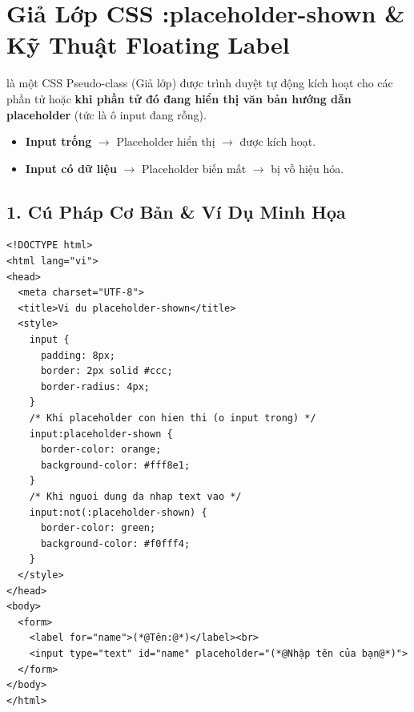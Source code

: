 \section{Giả Lớp CSS :placeholder-shown \& Kỹ Thuật Floating Label}
\label{sec:css_placeholder_shown}

\begin{conceptBox}
 là một CSS Pseudo-class (Giả lớp) được trình duyệt tự động kích hoạt cho các phần tử  hoặc  \textbf{khi phần tử đó đang hiển thị văn bản hướng dẫn placeholder} (tức là ô input đang rỗng).
\par\vspace{4pt}
\begin{itemize}[leftmargin=1.5em, itemsep=2pt, parsep=0pt]
    \item \textbf{Input trống} $\rightarrow$ Placeholder hiển thị $\rightarrow$  được kích hoạt.
    \item \textbf{Input có dữ liệu} $\rightarrow$ Placeholder biến mất $\rightarrow$  bị vồ hiệu hóa.
\end{itemize}
\end{conceptBox}

\subsection{1. Cú Pháp Cơ Bản \& Ví Dụ Minh Họa}

\begin{codeWindow}
\begin{lstlisting}[language=HTML5]
<!DOCTYPE html>
<html lang="vi">
<head>
  <meta charset="UTF-8">
  <title>Vi du placeholder-shown</title>
  <style>
    input {
      padding: 8px;
      border: 2px solid #ccc;
      border-radius: 4px;
    }
    /* Khi placeholder con hien thi (o input trong) */
    input:placeholder-shown {
      border-color: orange;
      background-color: #fff8e1;
    }
    /* Khi nguoi dung da nhap text vao */
    input:not(:placeholder-shown) {
      border-color: green;
      background-color: #f0fff4;
    }
  </style>
</head>
<body>
  <form>
    <label for="name">(*@Tên:@*)</label><br>
    <input type="text" id="name" placeholder="(*@Nhập tên của bạn@*)">
  </form>
</body>
</html>
\end{lstlisting}
\end{codeWindow}

